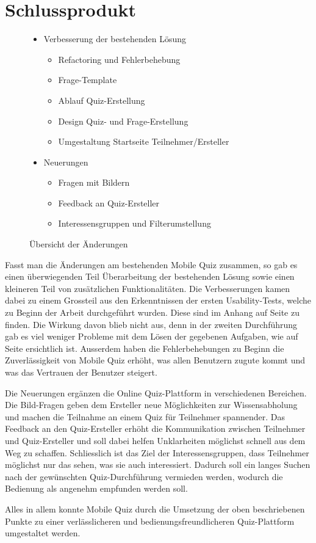 \newpage
\section{Schlussprodukt}

\begin{figure}[H]
	\centering
	\begin{itemize}
		\item Verbesserung der bestehenden Lösung
		\begin{itemize}
			\item \gls{Refactoring} und Fehlerbehebung
			\item Frage-Template
			\item Ablauf Quiz-Erstellung
			\item Design Quiz- und Frage-Erstellung
			\item Umgestaltung Startseite Teilnehmer/Ersteller
		\end{itemize}
		\item Neuerungen
		\begin{itemize}
			\item Fragen mit Bildern
			\item Feedback an Quiz-Ersteller
			\item Interessensgruppen und Filterumstellung
		\end{itemize}
	\end{itemize}
	\caption{Übersicht der Änderungen}
\end{figure}

Fasst man die Änderungen am bestehenden Mobile Quiz zusammen, so gab es einen überwiegenden Teil Überarbeitung der bestehenden Lösung sowie einen kleineren Teil von zusätzlichen Funktionalitäten. Die Verbesserungen kamen dabei zu einem Grossteil aus den Erkenntnissen der ersten \gls{Usability-Test}s, welche zu Beginn der Arbeit durchgeführt wurden. Diese sind im Anhang auf Seite \hyperlink{page.\getpagerefnumber{pdf:UTAW1}}{} zu finden. Die Wirkung davon blieb nicht aus, denn in der zweiten Durchführung gab es viel weniger Probleme mit dem Lösen der gegebenen Aufgaben, wie auf Seite \hyperlink{page.\getpagerefnumber{pdf:UTAW2}}{} ersichtlich ist.
Ausserdem haben die Fehlerbehebungen zu Beginn die Zuverlässigkeit von Mobile Quiz erhöht, was allen Benutzern zugute kommt und was das Vertrauen der Benutzer steigert.

Die Neuerungen ergänzen die Online Quiz-Plattform in verschiedenen Bereichen. Die Bild-Fragen geben dem Ersteller neue Möglichkeiten zur Wissensabholung und machen die Teilnahme an einem Quiz für Teilnehmer spannender.
Das Feedback an den Quiz-Ersteller erhöht die Kommunikation zwischen Teilnehmer und Quiz-Ersteller und soll dabei helfen Unklarheiten möglichst schnell aus dem Weg zu schaffen.
Schliesslich ist das Ziel der Interessensgruppen, dass Teilnehmer möglichst nur das sehen, was sie auch interessiert. Dadurch soll ein langes Suchen nach der gewünschten Quiz-Durchführung vermieden werden, wodurch die Bedienung als angenehm empfunden werden soll.

\bigskip

Alles in allem konnte Mobile Quiz durch die Umsetzung der oben beschriebenen Punkte zu einer verlässlicheren und bedienungsfreundlicheren Quiz-Plattform umgestaltet werden.

